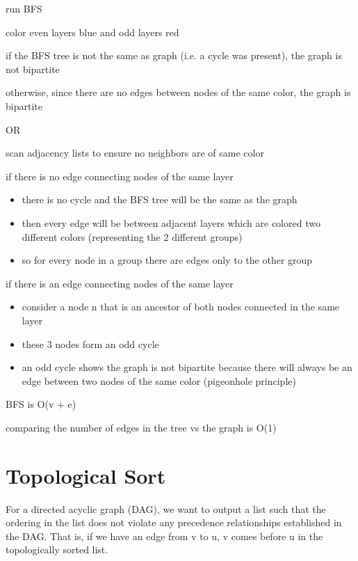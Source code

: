 \algorithm
{
    \item run BFS
    \item color even layers blue and odd layers red
    \item if the BFS tree is not the same as graph (i.e. a cycle was present), the graph is not bipartite 
    \item otherwise, since there are no edges between nodes of the same color, the graph is bipartite 
    \item OR
    \item scan adjacency lists to ensure no neighbors are of same color
    
}
{
    \item if there is no edge connecting nodes of the same layer
    \begin{itemize}
        \item there is no cycle and the BFS tree will be the same as the graph
        \item then every edge will be between adjacent layers which are colored two different colors (representing the 2 different groups)
        \item so for every node in a group there are edges only to the other group
    \end{itemize}
    \item if there is an edge connecting nodes of the same layer
    \begin{itemize}
        \item consider a node n that is an ancestor of both nodes connected in the same layer
        \item these 3 nodes form an odd cycle
        \item an odd cycle shows the graph is not bipartite because there will always be an edge between two nodes of the same color (pigeonhole principle)
    \end{itemize}
}
{
    \item BFS is O(v + e)
    \item comparing the number of edges in the tree vs the graph is O(1)
    
}
\section{Topological Sort}
For a directed acyclic graph (DAG), we want to output a list such that the ordering in the list does not violate any precedence relationships established in the DAG. That is, if we have an edge from v to u, v comes before u in the topologically sorted list.
 
